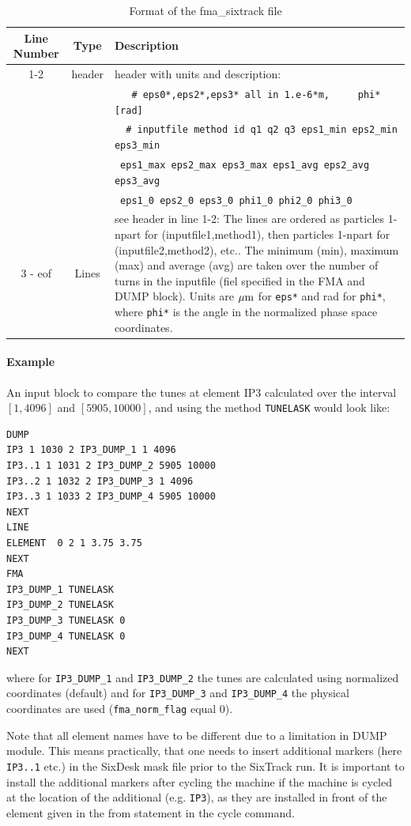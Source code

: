\documentclass[a4paper,11pt]{report}
\begin{document}
\begin{table}[H]
	\begin{center}
		\caption{Format of the fma\_sixtrack file}\label{fma:tab:3}
		\begin{tabularx}{\textwidth}{|c|c|X|}
			\hline
			{\bf Line Number} & {\bf Type} & {\bf Description} \\
			\hline
			1-2 & header & header with units and description:\\
			& & \verb|   # eps0*,eps2*,eps3* all in 1.e-6*m,     phi* [rad] | \\
			& & \verb|  # inputfile method id q1 q2 q3 eps1_min eps2_min eps3_min | \\
			& & \quad \verb| eps1_max eps2_max eps3_max eps1_avg eps2_avg eps3_avg |\\
			& & \quad \verb| eps1_0 eps2_0 eps3_0 phi1_0 phi2_0 phi3_0| \\\hline
			3 - eof & Lines & see header in line 1-2: The lines are ordered as particles 1-npart for (inputfile1,method1), then  particles 1-npart for (inputfile2,method2), etc.. The minimum (min), maximum (max) and average (avg) are taken over the number of turns in the inputfile (fiel specified in the FMA and DUMP block). Units are $\mu \rm m$ for \verb|eps*| and rad for \verb|phi*|, where \verb|phi*| is the angle in the normalized phase space coordinates.\\\hline
		\end{tabularx}
	\end{center}
\end{table}
\paragraph{Example}
An input block to compare the tunes at element IP3 calculated over the interval $[1,4096]$ and $[5905,10000]$, and using the method \verb|TUNELASK| would look like:
\begin{verbatim}
DUMP
IP3 1 1030 2 IP3_DUMP_1 1 4096
IP3..1 1 1031 2 IP3_DUMP_2 5905 10000
IP3..2 1 1032 2 IP3_DUMP_3 1 4096
IP3..3 1 1033 2 IP3_DUMP_4 5905 10000
NEXT
LINE
ELEMENT  0 2 1 3.75 3.75
NEXT
FMA
IP3_DUMP_1 TUNELASK
IP3_DUMP_2 TUNELASK
IP3_DUMP_3 TUNELASK 0
IP3_DUMP_4 TUNELASK 0
NEXT
\end{verbatim}
where for \verb|IP3_DUMP_1| and \verb|IP3_DUMP_2| the tunes are calculated using normalized coordinates (default) and for \verb|IP3_DUMP_3| and \verb|IP3_DUMP_4| the physical coordinates are used (\verb|fma_norm_flag| equal 0). 

Note that all element names have to be different due to a limitation in DUMP module. This means practically, that one needs to insert additional markers (here \verb|IP3..1| etc.) in the SixDesk \cite{sixdesk1,sixdesk2} mask file prior to the SixTrack run. It is important to install the additional markers after cycling the machine if the machine is cycled at the location of the additional (e.g. \verb|IP3|), as they are installed in front of the element given in the from statement in the cycle command.
\end{document}
